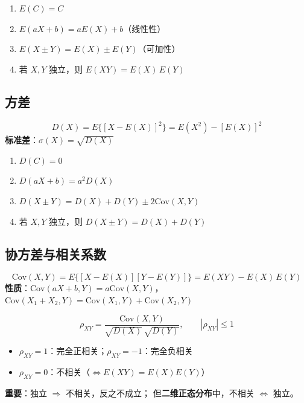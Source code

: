\documentclass[12pt, a4paper]{article}
\newcommand{\Cov}{\mathrm{Cov}}
\begin{document}
\begin{tcolorbox}[thmbox, title={期望的性质}]
    \begin{enumerate}
        \item $E(C)=C$
        \item $E(aX+b)=aE(X)+b$（线性性）
        \item $E(X\pm Y)=E(X)\pm E(Y)$（可加性）
        \item 若 $X,Y$ 独立，则 $E(XY)=E(X)\,E(Y)$
    \end{enumerate}
\end{tcolorbox}

\subsection{方差}

\begin{tcolorbox}[defbox, title={方差}]
    \[
        D(X) = E\{[X-E(X)]^2\} = E(X^2)-[E(X)]^2
    \]
    \textbf{标准差}：$\sigma(X)=\sqrt{D(X)}$
\end{tcolorbox}

\begin{tcolorbox}[thmbox, title={方差的性质}]
    \begin{enumerate}
        \item $D(C)=0$
        \item $D(aX+b)=a^2 D(X)$
        \item $D(X\pm Y)=D(X)+D(Y)\pm 2\Cov(X,Y)$
        \item 若 $X,Y$ 独立，则 $D(X\pm Y)=D(X)+D(Y)$
    \end{enumerate}
\end{tcolorbox}

\subsection{协方差与相关系数}

\begin{tcolorbox}[defbox, title={协方差}]
    \[
        \Cov(X,Y)=E\{[X-E(X)][Y-E(Y)]\}=E(XY)-E(X)\,E(Y)
    \]
    \textbf{性质}：$\Cov(aX+b,Y)=a\Cov(X,Y)$，
    $\Cov(X_1+X_2,Y)=\Cov(X_1,Y)+\Cov(X_2,Y)$
\end{tcolorbox}

\begin{tcolorbox}[defbox, title={相关系数}]
    \[
        \rho_{XY}=\frac{\Cov(X,Y)}{\sqrt{D(X)}\,\sqrt{D(Y)}}, \qquad |\rho_{XY}|\le 1
    \]
    \begin{itemize}
        \item $\rho_{XY}=1$：完全正相关；$\rho_{XY}=-1$：完全负相关
        \item $\rho_{XY}=0$：不相关（$\Leftrightarrow E(XY)=E(X)E(Y)$）
    \end{itemize}
    \textbf{重要}：独立 $\Rightarrow$ 不相关，反之不成立；
    但\textbf{二维正态分布}中，不相关 $\Leftrightarrow$ 独立。
\end{tcolorbox}
\end{document}
